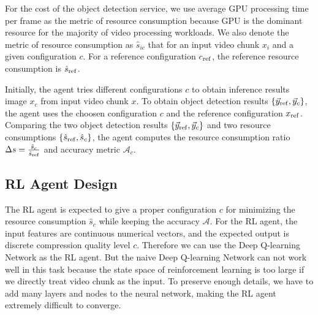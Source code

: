 For the cost of the object detection service, we use average GPU processing time per frame as the metric of resource consumption because GPU is the dominant resource for the majority of video processing workloads. We also denote the metric of resource consumption as $ \hat{s}_{ic} $ that for an input video chunk $ x_i $ and a given configuration $ c $. For a reference configuration $ c_{\rm ref} $, the reference resource consumption is $ \hat{s}_{\rm ref} $.

Initially, the agent tries different configurations $ c $ to obtain inference results image $ x_c $ from input video chunk $ x $. To obtain object detection results $ \{\vec{y}_{\rm ref}, \vec{y}_c\} $, the agent uses the choosen configuration $ c $ and the reference configuration $ x_{\rm ref} $. Comparing the two object detection results $ \{\vec{y}_{\rm ref}, \vec{y}_c\} $ and two resource consumptions $ \{\hat{s}_{\rm ref}, \hat{s}_c\} $, the agent computes the resource consumption ratio $ \Delta s = \frac{\hat{s}_c}{\hat{s}_{\rm ref}} $ and accuracy metric $ \mathcal{A}_c $.

\subsection{RL Agent Design}

The RL agent is expected to give a proper configuration $ c $ for minimizing the resource consumption $ \hat{s}_c $ while keeping the accuracy $ \mathcal{A} $. For the RL agent, the input features are continuous numerical vectors, and the expected output is discrete compression quality level $ c $. Therefore we can use the Deep Q-learning Network \cite{DQN} as the RL agent. But the naive Deep Q-learning Network can not work well in this task because the state space of reinforcement learning is too large if we directly treat video chunk as the input. To preserve enough details, we have to add many layers and nodes to the neural network, making the RL agent extremely difficult to converge.  
%

